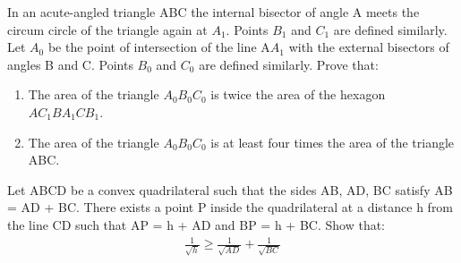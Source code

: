 \item In an acute-angled triangle ABC the internal bisector of angle A meets the circum circle of the triangle again at $A_1$. Points $B_1$ and $C_1$ are defined similarly. Let $A_0$ be the point of intersection of the line A$A_1$ with the external bisectors of angles B and C. Points $B_0$ and $C_0$ are defined similarly. Prove that:
\begin{enumerate}
\item The area of the triangle $A_0B_0C_0$ is twice the area of the hexagon $AC_1BA_1CB_1$.
\item The area of the triangle $A_0B_0C_0$ is at least four times the area of the triangle ABC.
\end{enumerate}

\item Let ABCD be a convex quadrilateral such that the sides AB, AD, BC satisfy AB = AD + BC. There exists a point P inside the quadrilateral at a distance h from the line CD such that AP = h + AD and BP = h + BC. Show that:
\begin{align*}
\frac{1}{\sqrt{h}} \geq \frac{1}{\sqrt{AD}} + \frac{1}{\sqrt{BC}}
\end{align*}






















